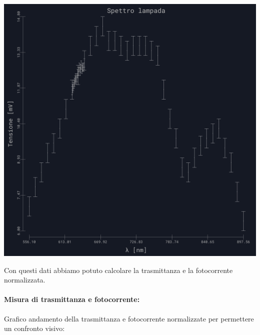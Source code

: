 \documentclass{article}
\begin{document}
\begin{center}
    \begin{minipage}{0.4\textwidth} %
        \centering
        \includegraphics[width=1\linewidth]{../images/grafico15.png} %
        \label{grafico:15}
    \end{minipage}
    \hfill %
    \begin{minipage}{0.25\textwidth}    
    \end{minipage}
\end{center}
Con questi dati abbiamo potuto calcolare la trasmittanza e la fotocorrente normalizzata.

\paragraph{Misura di trasmittanza e fotocorrente:} Grafico andamento della trasmittanza e fotocorrente normalizzate per permettere un confronto visivo:
\end{document}

